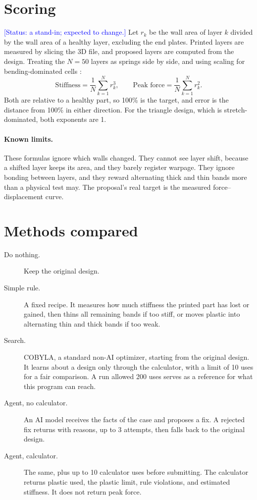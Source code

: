 \documentclass[11pt]{article}
\newcommand{\status}[1]{\textcolor{blue}{[Status: #1]}}
\begin{document}
\section{Scoring}
\status{a stand-in; expected to change.}
Let $r_k$ be the wall area of layer $k$ divided by the wall area of a healthy layer, excluding the end plates. Printed layers are measured by slicing the 3D file, and proposed layers are computed from the design. Treating the $N = 50$ layers as springs side by side, and using scaling for bending-dominated cells \cite{gibson1997cellular}:
\begin{equation}
  \text{Stiffness} = \frac{1}{N}\sum_{k=1}^{N} r_k^{3}, \qquad
  \text{Peak force} = \frac{1}{N}\sum_{k=1}^{N} r_k^{2}.
\end{equation}
Both are relative to a healthy part, so 100\% is the target, and error is the distance from 100\% in either direction. For the triangle design, which is stretch-dominated, both exponents are 1.

\paragraph{Known limits.} These formulas ignore which walls changed. They cannot see layer shift, because a shifted layer keeps its area, and they barely register warpage. They ignore bonding between layers, and they reward alternating thick and thin bands more than a physical test may. The proposal's real target is the measured force--displacement curve.

\section{Methods compared}
\begin{description}
  \item[Do nothing.] Keep the original design.
  \item[Simple rule.] A fixed recipe. It measures how much stiffness the printed part has lost or gained, then thins all remaining bands if too stiff, or moves plastic into alternating thin and thick bands if too weak.
  \item[Search.] COBYLA, a standard non-AI optimizer, starting from the original design. It learns about a design only through the calculator, with a limit of 10 uses for a fair comparison. A run allowed 200 uses serves as a reference for what this program can reach.
  \item[Agent, no calculator.] An AI model receives the facts of the case and proposes a fix. A rejected fix returns with reasons, up to 3 attempts, then falls back to the original design.
  \item[Agent, calculator.] The same, plus up to 10 calculator uses before submitting. The calculator returns plastic used, the plastic limit, rule violations, and estimated stiffness. It does not return peak force.
\end{description}
\end{document}
